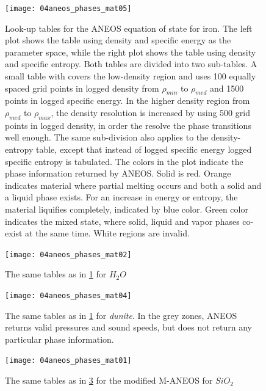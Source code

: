\begin{figure}
\begin{center}
\texttt{[image: 04aneos\_phases\_mat05]}
\caption{Look-up tables for the ANEOS equation of state for iron. The left plot shows the table using density and specific energy as the parameter space, while the right plot shows the table using density and specific entropy. Both tables are divided into two sub-tables. A small table with covers the low-density region and uses 100 equally spaced grid points in logged density from $\rho_{min}$ to $\rho_{med}$ and 1500 points in logged specific energy. In the higher density region from $\rho_{med}$ to $\rho_{max}$, the density resolution is increased by using 500 grid points in logged density, in order the resolve the phase transitions well enough. The same sub-division also applies to the density-entropy table, except that instead of logged specific energy logged specific entropy is tabulated. The colors in the plot indicate the phase information returned by ANEOS. Solid is red. Orange indicates material where partial melting occurs and both a solid and a liquid phase exists. For an increase in energy or entropy, the material liquifies completely, indicated by blue color. Green color indicates the mixed state, where solid, liquid and vapor phases co-exist at the same time. White regions are invalid.}
\label{ch02_eos02_fig02}
\end{center}
\end{figure}

\begin{figure}
\begin{center}
\texttt{[image: 04aneos\_phases\_mat02]}
\caption{The same tables as in \ref{ch02_eos02_fig02} for $H_2 O$ }
\label{ch02_eos02_fig03}
\end{center}
\end{figure}

\begin{figure}
\begin{center}
\texttt{[image: 04aneos\_phases\_mat04]}
\caption{The same tables as in \ref{ch02_eos02_fig02} for \emph{dunite}. In the grey zones, ANEOS returns valid pressures and sound speeds, but does not return any particular phase information.}
\label{ch02_eos02_fig04}
\end{center}
\end{figure}

\begin{figure}
\begin{center}
\texttt{[image: 04aneos\_phases\_mat01]}
\caption{The same tables as in \ref{ch02_eos02_fig04} for the modified M-ANEOS for $SiO_2$}
\label{ch02_eos02_fig05}
\end{center}
\end{figure}

